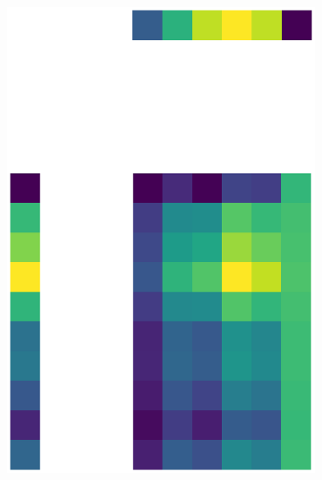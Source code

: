 \documentclass[10pt,twocolumn]{article}
\begin{document}
\begin{figure}[H]
\begin{subfigure}[t]{.15\textwidth}
\includegraphics[scale=.2]{DWGs/semi-structured-matrix-reconstruction-PCs-1.eps}
\caption{ }
\end{subfigure}
\begin{subfigure}[t]{.15\textwidth}
\centering

\end{subfigure}
\end{figure}
\end{document}
